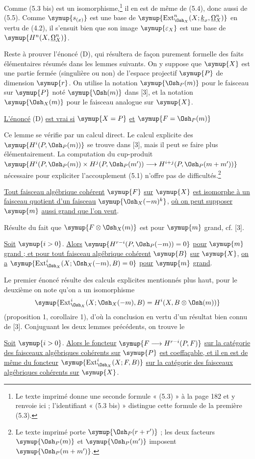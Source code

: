 Comme (5.3 bis) est un isomorphisme,\footnote{Le texte imprimé donne une
seconde formule « (5.3) » à la page 182 et y renvoie ici ; l'identifiant
« (5.3 bis) » distingue cette formule de la première (5.3).} il en est de même
de (5.4), donc aussi de (5.5). Comme $\symup{s_{(x)}}$ est une base de
$\symup{\operatorname{Ext}_{\Osh_X}^{n}(X;\underline{k}_x,\underline{\Omega}_X^{n})}$ en vertu de (4.2), il
s'ensuit bien que son image $\symup{\varepsilon_X}$ est une base de
$\symup{H^{n}(X,\underline{\Omega}_X^{n})}$.

Reste à prouver l'énoncé (D), qui résultera de façon purement formelle des faits
élémentaires résumés dans les lemmes suivants. On y suppose que $\symup{X}$ est une
partie fermée (singulière ou non) de l'espace projectif $\symup{P}$ de dimension $\symup{r}$.
On utilise la notation $\symup{\Osh_P(m)}$ pour le faisceau sur $\symup{P}$ noté $\symup{\Osh(m)}$ dans
[3], et la notation $\symup{\Osh_X(m)}$ pour le faisceau analogue sur $\symup{X}$.

 \uline{L'énoncé} (D) \uline{est vrai si} $\symup{X=P}$ \uline{et} $\symup{F=\Osh_P(m)}$

Ce lemme se vérifie par un calcul direct. Le calcul explicite des
$\symup{H^{i}(P,\Osh_P(m))}$ se trouve dans [3], mais il peut se faire plus
élémentairement. La computation du cup-produit $\symup{H^{i}(P,\Osh_P(m))\times H^{j}(P,\Osh_P(m'))\longrightarrow H^{i+j}(P,\Osh_P(m+m'))}$ nécessaire pour expliciter l'accouplement (5.1) n'offre pas de
difficultés.\footnote{Le texte imprimé porte $\symup{\Osh_P(r+r')}$ ; les deux facteurs
$\symup{\Osh_P(m)}$ et $\symup{\Osh_P(m')}$ imposent $\symup{\Osh_P(m+m')}$.}

 \uline{Tout faisceau algébrique cohérent} $\symup{F}$ \uline{sur} $\symup{X}$ \uline{est isomorphe à
un faisceau quotient d'un faisceau} $\symup{\Osh_X(-m)^{k}}$, \uline{où on peut supposer} $\symup{m}$
\uline{aussi grand que l'on veut}.

Résulte du fait que $\symup{F\otimes\Osh_X(m)}$ est  pour
$\symup{m}$ grand, cf. [3].

 \uline{Soit} $\symup{i>0}$. \uline{Alors}
$\symup{H^{r-i}(P,\Osh_P(-m))=0}$ \uline{pour} $\symup{m}$ \uline{grand ; et pour tout faisceau algébrique
cohérent} $\symup{B}$ \uline{sur} $\symup{X}$, \uline{on a} $\symup{\operatorname{Ext}_{\Osh_X}^{i}(X;\Osh_X(-m),B)=0}$ \uline{pour} $\symup{m}$ \uline{grand}.

Le premier énoncé résulte des calculs explicites mentionnés plus haut, pour le
deuxième on note qu'on a un isomorphisme
\[
  \symup{\operatorname{Ext}_{\Osh_X}^{i}(X;\Osh_X(-m),B)
  =H^{i}(X,B\otimes\Osh(m))}
\]
(proposition 1, corollaire 1), d'où la conclusion en vertu d'un résultat bien
connu de [3]. Conjuguant les deux lemmes précédents, on trouve le

 \uline{Soit} $\symup{i>0}$. \uline{Alors le foncteur}
$\symup{F\longrightarrow H^{r-i}(P,F)}$ \uline{sur la catégorie des faisceaux algébriques cohérents
sur} $\symup{P}$ \uline{est coeffaçable, et il en est de même du foncteur}
$\symup{\operatorname{Ext}_{\Osh_X}^{i}(X;F,B)}$ \uline{sur la catégorie des faisceaux
algébriques cohérents sur} $\symup{X}$.

